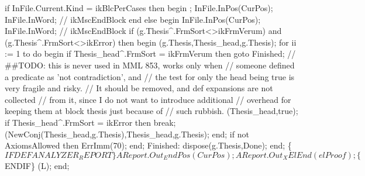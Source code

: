    if InFile.Current.Kind = ikBlcPerCases then
   begin
      ;
      InFile.InPos(CurPos); InFile.InWord; // ikMscEndBlock
   end
   else
   begin
      InFile.InPos(CurPos); InFile.InWord; // ikMscEndBlock
      if (g.Thesis^.FrmSort<>ikFrmVerum) and (g.Thesis^.FrmSort<>ikError) then
      begin
         (g.Thesis,Thesis_head,g.Thesis);
         for ii := 1 to  do
         begin
            if Thesis_head^.FrmSort = ikFrmVerum then goto Finished;
            // ##TODO: this is never used in MML 853, works only when
            //  someone defined a predicate as 'not contradiction', and
            // the test for only the head being true is very fragile and risky.
            // It should be removed, and def expansions are not collected
            // from it, since I do not want to introduce additional
            // overhead for keeping them at block thesis just because of
            // such rubbish.
            (Thesis_head,true);
            if Thesis_head^.FrmSort = ikError then break;
            (NewConj(Thesis_head,g.Thesis),Thesis_head,g.Thesis);
         end;
         if not AxiomsAllowed then
            ErrImm(70);
      end;
      Finished:
         dispose(g.Thesis,Done);
   end;
   \{$IFDEF ANALYZER_REPORT\}
   AReport.Out_EndPos(CurPos);
   AReport.Out_XElEnd(elProof);
   \{$ENDIF\}
   (L);
end;
\eatline
{}\nwendcode{}\nwdocspar
